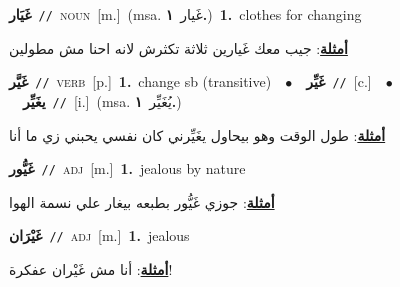 \documentclass[10pt,a4paper,twoside]{article} %
\begin{document}
\begin{multicols}{2}
{\setlength\topsep{0pt}\textbf{\foreignlanguage{arabic}{غَيَار}}\ {\color{gray}\texttt{//}\color{black}}\ \textsc{noun}\ [m.]\ \color{gray}(msa. \foreignlanguage{arabic}{غَيار}~\foreignlanguage{arabic}{\textbf{١.}})\color{black}\ \textbf{1.}~clothes for changing\  \begin{flushright}\color{gray}\foreignlanguage{arabic}{\textbf{\underline{\foreignlanguage{arabic}{أمثلة}}}: جيب معك غَيارين ثلاثة تكثرش لانه احنا مش مطولين}\end{flushright}\color{black}} \vspace{2mm}

{\setlength\topsep{0pt}\textbf{\foreignlanguage{arabic}{غَيَّر}}\ {\color{gray}\texttt{//}\color{black}}\ \textsc{verb}\ [p.]\ \textbf{1.}~change sb (transitive)\ \ $\bullet$\ \ \setlength\topsep{0pt}\textbf{\foreignlanguage{arabic}{غَيِّر}}\ {\color{gray}\texttt{//}\color{black}}\ [c.]\ \ $\bullet$\ \ \setlength\topsep{0pt}\textbf{\foreignlanguage{arabic}{يغَيِّر}}\ {\color{gray}\texttt{//}\color{black}}\ [i.]\ \color{gray}(msa. \foreignlanguage{arabic}{يُغَيِّر}~\foreignlanguage{arabic}{\textbf{١.}})\color{black}\  \begin{flushright}\color{gray}\foreignlanguage{arabic}{\textbf{\underline{\foreignlanguage{arabic}{أمثلة}}}: طول الوقت وهو بيحاول يغَيِّرني كان نفسي يحبني زي ما أنا}\end{flushright}\color{black}} \vspace{2mm}

{\setlength\topsep{0pt}\textbf{\foreignlanguage{arabic}{غَيُّور}}\ {\color{gray}\texttt{//}\color{black}}\ \textsc{adj}\ [m.]\ \textbf{1.}~jealous by nature\  \begin{flushright}\color{gray}\foreignlanguage{arabic}{\textbf{\underline{\foreignlanguage{arabic}{أمثلة}}}: جوزي غَيُّور بطبعه بيغار علي نسمة الهوا}\end{flushright}\color{black}} \vspace{2mm}

{\setlength\topsep{0pt}\textbf{\foreignlanguage{arabic}{غَيْرَان}}\ {\color{gray}\texttt{//}\color{black}}\ \textsc{adj}\ [m.]\ \textbf{1.}~jealous\  \begin{flushright}\color{gray}\foreignlanguage{arabic}{\textbf{\underline{\foreignlanguage{arabic}{أمثلة}}}: أنا مش غَيْران عفكرة!}\end{flushright}\color{black}} \vspace{2mm}


\end{multicols}
\end{document}
